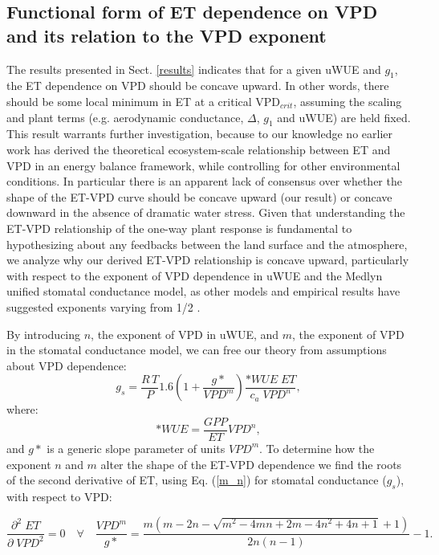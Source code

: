 \documentclass[draft]{agujournal2019}
\begin{document}
\subsection{Functional form of ET dependence on VPD and its relation
  to the VPD exponent}
\label{functional_form}

The results presented in Sect. \ref{results} indicates that for a
given uWUE and $g_1$, the ET dependence on VPD should be concave
upward. In other words, there should be some local minimum in ET at a
critical VPD$_{crit}$, assuming the scaling and plant terms
(e.g. aerodynamic conductance, $\Delta$, $g_1$ and uWUE) are held
fixed. This result warrants further investigation, because to our
knowledge no earlier work has derived the theoretical ecosystem-scale
relationship between ET and VPD in an energy balance framework, while
controlling for other environmental conditions. In particular there is
an apparent lack of consensus over whether the shape of the ET-VPD
curve should be concave upward (our result) or concave downward in the
absence of dramatic water stress. Given that understanding the ET-VPD
relationship of the one-way plant response is fundamental to
hypothesizing about any feedbacks between the land surface and the
atmosphere, we analyze why our derived ET-VPD relationship is concave
upward, particularly with respect to the exponent of VPD dependence in
uWUE and the Medlyn unified stomatal conductance model, as other
models and empirical results have suggested exponents varying from 1/2
\cite{Leuning_1990, Zhou_2015, Lin_2018}.

By introducing $n$, the exponent of VPD in uWUE, and $m$, the exponent
of VPD in the stomatal conductance model, we can free our theory from
assumptions about VPD dependence:
  \begin{equation}
    g_s = \frac{R \, T}{P} 1.6 \left(1 + \frac{g*}{VPD^m}\right) \frac{*WUE \; ET}{c_a \; VPD^n},
    \label{m_n}
  \end{equation}
where:
\[*WUE = \frac{GPP}{ET}VPD^n,\] and $g*$ is a generic slope parameter
of units $VPD^m$. To determine how the exponent $n$ and $m$ alter the
shape of the ET-VPD dependence we find the roots of the second
derivative of ET, using Eq. (\ref{m_n}) for stomatal conductance
($g_s$), with respect to VPD:

\begin{equation}
\frac{\partial^2 \; ET}{\partial \; VPD^2} = 0 \quad \forall \quad\frac{VPD^m}{g*} = \frac{m \left(m - 2 n - \sqrt{m^{2} - 4 m n + 2 m - 4 n^{2} + 4 n + 1} + 1\right)}{2 n \left(n - 1\right)} - 1.
\label{curves}
\end{equation}
\end{document}
